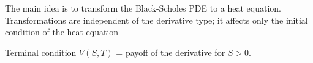 The main idea is to transform the Black-Scholes PDE to a heat equation.
Transformations are independent of the derivative type; it affects only the initial condition of the heat equation


Terminal condition $V(S, T)$ = payoff of the derivative for $S > 0$.

%
%
%
%
